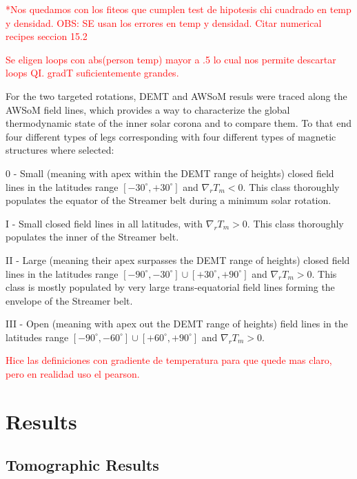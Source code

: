 \documentclass[namedreferences]{solarphysics}
\newcommand{\mdeg}{^\circ}
\begin{document}
\begin{article}
\textcolor{red}{*Nos quedamos con los fiteos que cumplen test de hipotesis chi cuadrado en temp y densidad.
OBS: SE usan los errores en temp y densidad. Citar numerical recipes seccion 15.2}

\textcolor{red}{Se eligen loops con abs(person temp) mayor a .5 lo cual nos permite descartar loops QI. gradT suficientemente grandes.}

For the two targeted rotations, DEMT and AWSoM resuls were traced along the AWSoM field lines, which provides a way to characterize the global thermodynamic state of the inner solar corona and to compare them. To that end four different types of legs corresponding with four different types of magnetic structures where selected:

  0 - Small (meaning with apex within the DEMT range of heights) closed field lines in the latitudes range $[-30\mdeg,+30\mdeg]$ and $\nabla_r T_m < 0$. This class thoroughly populates the equator of the Streamer belt during a minimum solar rotation.

  I - Small closed field lines in all latitudes, with $\nabla_r T_m > 0$. This class thoroughly populates the inner of the Streamer belt.

  II - Large (meaning their apex surpasses the DEMT range of heights) closed field lines in the latitudes range $[-90\mdeg,-30\mdeg] \cup [+30\mdeg,+90\mdeg]$ and $\nabla_r T_m > 0$. This class is mostly populated by very large trans-equatorial field lines forming the envelope of the Streamer belt. 

 III - Open (meaning with apex out the DEMT range of heights) field lines in the latitudes range $[-90\mdeg,-60\mdeg] \cup [+60\mdeg,+90\mdeg]$ and $\nabla_r T_m > 0$.

\textcolor{red}{Hice las definiciones con gradiente de temperatura para que quede mas claro, pero en realidad uso el pearson.} 


\section{Results}\label{resu} 

\subsection{Tomographic Results}\label{demt_res} 


\end{article}
\end{document}
